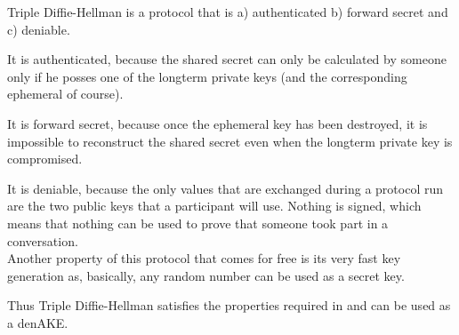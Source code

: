 Triple Diffie-Hellman is a protocol that is a) authenticated b) forward secret
and c) deniable.

It is authenticated, because the shared secret can only be calculated by someone
only if he posses one of the longterm private keys (and the corresponding ephemeral
of course).

It is forward secret, because once the ephemeral key has been destroyed, it is
impossible to reconstruct the shared secret even when the longterm
private key is compromised.

It is deniable, because the only values that are exchanged during a protocol run
are the two public keys that a participant will use. Nothing is signed, which means
that nothing can be used to prove that someone took part in a conversation.\\[0.5cm]

Another property of this protocol that comes for free is its very fast key generation
as, basically, any random number can be used as a secret key.

Thus Triple Diffie-Hellman satisfies the properties required in \cite{mpotr} and
can be used as a denAKE.

